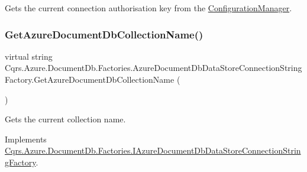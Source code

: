 Gets the current connection authorisation key from the \hyperlink{namespaceCqrs_1_1Azure_1_1ConfigurationManager}{Configuration\+Manager}. 

\mbox{\label{classCqrs_1_1Azure_1_1DocumentDb_1_1Factories_1_1AzureDocumentDbDataStoreConnectionStringFactory_a0685593d04e9a905d270800c278ddb42_a0685593d04e9a905d270800c278ddb42}} 
\subsubsection{\texorpdfstring{Get\+Azure\+Document\+Db\+Collection\+Name()}{GetAzureDocumentDbCollectionName()}}
{\footnotesize\ttfamily virtual string Cqrs.\+Azure.\+Document\+Db.\+Factories.\+Azure\+Document\+Db\+Data\+Store\+Connection\+String\+Factory.\+Get\+Azure\+Document\+Db\+Collection\+Name (\begin{DoxyParamCaption}{ }\end{DoxyParamCaption})\hspace{0.3cm}{\ttfamily [virtual]}}



Gets the current collection name. 



Implements \hyperlink{interfaceCqrs_1_1Azure_1_1DocumentDb_1_1Factories_1_1IAzureDocumentDbDataStoreConnectionStringFactory_a0ad3d0046331ea62ea2415f2c0af5675_a0ad3d0046331ea62ea2415f2c0af5675}{Cqrs.\+Azure.\+Document\+Db.\+Factories.\+I\+Azure\+Document\+Db\+Data\+Store\+Connection\+String\+Factory}.

